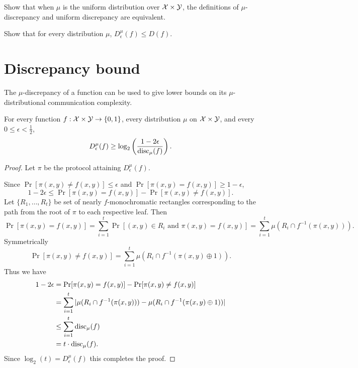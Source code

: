 \exercises

\begin{exercise}
Show that when $\mu$ is the uniform distribution over $\mathcal{X} \times \mathcal{Y}$, the definitions of $\mu$-discrepancy and uniform discrepancy are equivalent.
\end{exercise}

\begin{exercise}
Show that for every distribution $\mu$, $D^\mu_\epsilon(f) \le D(f)$.
\end{exercise}


\newpage \section{Discrepancy bound}

The $\mu$-discrepancy of a function can be used to give lower bounds on its $\mu$-distributional communication complexity.

\begin{lemma}
For every function $f : \mathcal{X} \times \mathcal{Y} \to \{0,1\}$, every distribution $\mu$ on $\mathcal{X} \times \mathcal{Y}$, and every $0 \le \epsilon < \frac12$,
\[
D_\epsilon^{\mu}(f) \ge \log_2 \left( \frac{1-2\epsilon}{\mathrm{disc}_\mu(f)} \right).
\]
\end{lemma}

\begin{proof}
Let $\pi$ be the protocol attaining $D_\epsilon^{\mu}(f)$. 

Since $\Pr[\pi(x,y) \neq f(x,y)] \leq \epsilon$ and $\Pr[\pi(x,y) = f(x,y)] \geq 1-\epsilon$,
$$1-2\epsilon \leq \Pr[\pi(x,y) = f(x,y)] - \Pr[\pi(x,y) \neq f(x,y)].$$
Let $\{R_1, \dots, R_t\}$ be set of nearly $f$-monochromatic rectangles corresponding to the path from the root of $\pi$ to each respective leaf. Then
$$\Pr[\pi(x,y) = f(x,y)] = \sum_{i=1}^t \Pr[(x,y) \in R_i \text{ and }\pi(x,y) = f(x,y) ] = \sum_{i=1}^t \mu(R_i \cap f^{-1}(\pi(x,y))).$$
Symmetrically
$$\Pr[\pi(x,y) \neq f(x,y)] = \sum_{i=1}^t\mu(R_i \cap f^{-1}(\pi(x,y)\oplus 1)).$$
Thus we have
\begin{align*}1-2\epsilon &= \Pr[\pi(x,y) = f(x,y)] - \Pr[\pi(x,y) \neq f(x,y)] \\
&=\sum_{i=1}^t|\mu(R_i\cap f^{-1}(\pi(x,y))) -\mu(R_i \cap f^{-1}(\pi(x,y)\oplus 1))| \\
&\leq \sum_{i=1}^t \mathrm{disc}_\mu(f)\\
&= t\cdot\mathrm{disc}_\mu(f).\end{align*}
Since $\log_2(t) = D_\epsilon^{\mu}(f)$ this completes the proof.
\end{proof}


